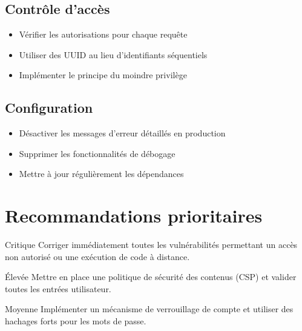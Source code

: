 \subsection{Contrôle d'accès}
\begin{itemize}
    \item Vérifier les autorisations pour chaque requête
    \item Utiliser des UUID au lieu d'identifiants séquentiels
    \item Implémenter le principe du moindre privilège
\end{itemize}

\subsection{Configuration}
\begin{itemize}
    \item Désactiver les messages d'erreur détaillés en production
    \item Supprimer les fonctionnalités de débogage
    \item Mettre à jour régulièrement les dépendances
\end{itemize}

\section{Recommandations prioritaires}
\begin{priorityrecommendation}{Critique}
    Corriger immédiatement toutes les vulnérabilités permettant un accès non autorisé ou une exécution de code à distance.
\end{priorityrecommendation}

\begin{priorityrecommendation}{Élevée}
    Mettre en place une politique de sécurité des contenus (CSP) et valider toutes les entrées utilisateur.
\end{priorityrecommendation}

\begin{priorityrecommendation}{Moyenne}
    Implémenter un mécanisme de verrouillage de compte et utiliser des hachages forts pour les mots de passe.
\end{priorityrecommendation}
